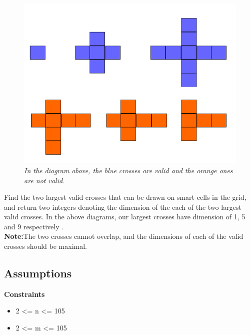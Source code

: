 \documentclass[a4paper,12pt]{article}
\begin{document}
 \begin{figure}[h!]     
       	\centering
       	\vspace{-2mm}
		\includegraphics[scale=.6]{prob1}
		\vspace{-7mm}
		\caption{\textit{In the diagram above, the blue crosses are valid and the orange ones are not valid. }}
		\end{figure}
		
		Find the two largest valid crosses that can be drawn on smart cells in the grid, and return two integers denoting the dimension of the each of the two largest valid crosses. In the above diagrams, our largest crosses have dimension of 1,  5 and 9 respectively .\\
\textbf{Note:}The two crosses cannot overlap, and the dimensions of each of the valid crosses should be maximal.\\
	


\subsection{Assumptions}
  \textbf{Constraints}
   \begin{itemize}
   \item 2 <= n <= 105
   \item 2 <= m <= 105
   \end{itemize}

\newpage
\end{document}
